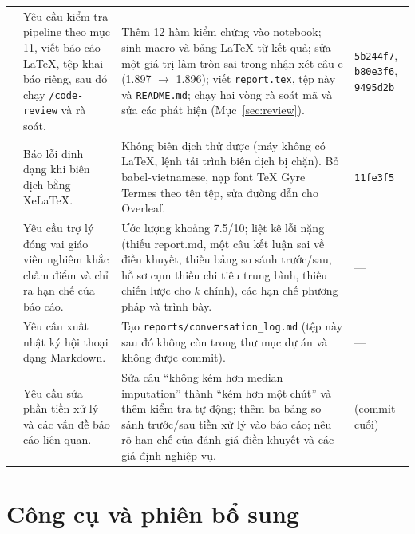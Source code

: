 \documentclass[11pt,a4paper]{article}
\begin{document}
\begin{longtable}{P{0.04\textwidth}P{0.38\textwidth}P{0.42\textwidth}P{0.08\textwidth}}
 & Yêu cầu kiểm tra pipeline theo mục 11, viết báo cáo LaTeX, tệp khai báo riêng, sau đó chạy \texttt{/code-review} và rà soát. &
Thêm 12 hàm kiểm chứng vào notebook; sinh macro và bảng LaTeX từ kết quả; sửa một giá trị làm tròn sai trong nhận xét câu e (1.897 $\rightarrow$ 1.896); viết \texttt{report.tex}, tệp này và \texttt{README.md}; chạy hai vòng rà soát mã và sửa các phát hiện (Mục~\ref{sec:review}). & \texttt{5b244f7}, \texttt{b80e3f6}, \texttt{9495d2b} \\
 & Báo lỗi định dạng khi biên dịch bằng XeLaTeX. &
Không biên dịch thử được (máy không có LaTeX, lệnh tải trình biên dịch bị chặn). Bỏ babel-vietnamese, nạp font TeX Gyre Termes theo tên tệp, sửa đường dẫn cho Overleaf. & \texttt{11fe3f5} \\
 & Yêu cầu trợ lý đóng vai giáo viên nghiêm khắc chấm điểm và chỉ ra hạn chế của báo cáo. &
Ước lượng khoảng 7.5/10; liệt kê lỗi nặng (thiếu report.md, một câu kết luận sai về điền khuyết, thiếu bảng so sánh trước/sau, hồ sơ cụm thiếu chi tiêu trung bình, thiếu chiến lược cho $k$ chính), các hạn chế phương pháp và trình bày. & — \\
 & Yêu cầu xuất nhật ký hội thoại dạng Markdown. &
Tạo \texttt{reports/conversation\_log.md} (tệp này sau đó không còn trong thư mục dự án và không được commit). & — \\
 & Yêu cầu sửa phần tiền xử lý và các vấn đề báo cáo liên quan. &
Sửa câu ``không kém hơn median imputation'' thành ``kém hơn một chút'' và thêm kiểm tra tự động; thêm ba bảng so sánh trước/sau tiền xử lý vào báo cáo; nêu rõ hạn chế của đánh giá điền khuyết và các giả định nghiệp vụ. & (commit cuối) \\
\bottomrule
\end{longtable}

\section{Công cụ và phiên bổ sung}
\end{document}
